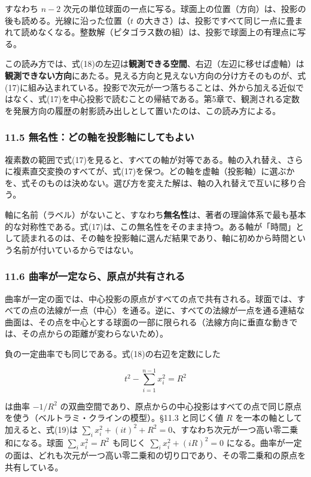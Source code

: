 \documentclass[
  a4paper,
]{ltjsarticle}
\begin{document}
すなわち \(n-2\)
次元の単位球面の一点に写る。球面上の位置（方向）は、投影の後も読める。光線に沿った位置（\(t\)
の大きさ）は、投影ですべて同じ一点に畳まれて読めなくなる。整数解（ピタゴラス数の組）は、投影で球面上の有理点に写る。

この読み方では、式(18)の左辺は\textbf{観測できる空間}、右辺（左辺に移せば虚軸）は\textbf{観測できない方向}にあたる。見える方向と見えない方向の分け方そのものが、式(17)に組み込まれている。投影で次元が一つ落ちることは、外から加える近似ではなく、式(17)を中心投影で読むことの帰結である。第5章で、観測される定数を発展方向の履歴の射影読み出しとして置いたのは、この読み方による。

\subsubsection{11.5
無名性：どの軸を投影軸にしてもよい}\label{ux7121ux540dux6027ux3069ux306eux8ef8ux3092ux6295ux5f71ux8ef8ux306bux3057ux3066ux3082ux3088ux3044}

複素数の範囲で式(17)を見ると、すべての軸が対等である。軸の入れ替え、さらに複素直交変換のすべてが、式(17)を保つ。どの軸を虚軸（投影軸）に選ぶかを、式そのものは決めない。選び方を変えた解は、軸の入れ替えで互いに移り合う。

軸に名前（ラベル）がないこと、すなわち\textbf{無名性}は、著者の理論体系で最も基本的な対称性である。式(17)は、この無名性をそのまま持つ。ある軸が「時間」として読まれるのは、その軸を投影軸に選んだ結果であり、軸に初めから時間という名前が付いているからではない。

\subsubsection{11.6
曲率が一定なら、原点が共有される}\label{ux66f2ux7387ux304cux4e00ux5b9aux306aux3089ux539fux70b9ux304cux5171ux6709ux3055ux308cux308b}

曲率が一定の面では、中心投影の原点がすべての点で共有される。球面では、すべての点の法線が一点（中心）を通る。逆に、すべての法線が一点を通る連結な曲面は、その点を中心とする球面の一部に限られる（法線方向に垂直な動きでは、その点からの距離が変わらないため）。

負の一定曲率でも同じである。式(18)の右辺を定数にした

\[
t^2-\sum_{i=1}^{n-1}x_i^2=R^2
\tag{19}
\]

は曲率 \(-1/R^2\)
の双曲空間であり、原点からの中心投影はすべての点で同じ原点を使う（ベルトラミ・クラインの模型）。§11.3
と同じく値 \(R\) を一本の軸として加えると、式(19)は
\(\sum_i x_i^2+(it)^2+R^2=0\)、すなわち次元が一つ高い零二乗和になる。球面
\(\sum_i x_i^2=R^2\) も同じく \(\sum_i x_i^2+(iR)^2=0\)
になる。曲率が一定の面は、どれも次元が一つ高い零二乗和の切り口であり、その零二乗和の原点を共有している。
\end{document}
